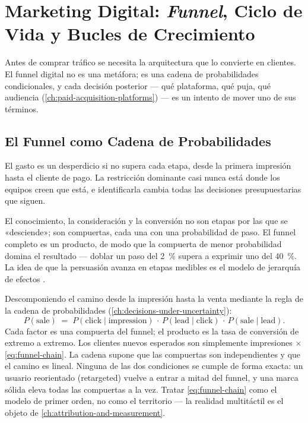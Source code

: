 \chapter{Marketing Digital: \emph{Funnel}, Ciclo de Vida y Bucles de Crecimiento}\label{ch:digital-funnel-and-crm}


Antes de comprar tráfico se necesita la arquitectura que lo convierte en clientes. El funnel digital no es una metáfora; es una cadena de probabilidades condicionales, y cada decisión posterior --- qué plataforma, qué puja, qué audiencia (\cref{ch:paid-acquisition-platforms}) --- es un intento de mover uno de sus términos.

\section{El Funnel como Cadena de Probabilidades}\label{sec:funnel-chain}

El gasto es un desperdicio si no supera cada etapa, desde la primera impresión hasta el cliente de pago. La restricción dominante casi nunca está donde los equipos creen que está, e identificarla cambia todas las decisiones presupuestarias que siguen.

El conocimiento, la consideración y la conversión no son etapas por las que se «desciende»; son compuertas, cada una con una probabilidad de paso. El funnel completo es un producto, de modo que la compuerta de menor probabilidad domina el resultado --- doblar un paso del \qty{2}{\percent} supera a exprimir uno del \qty{40}{\percent}. La idea de que la persuasión avanza en etapas medibles es el modelo de jerarquía de efectos \parencite{lavidge1961model,barry1987development}.

Descomponiendo el camino desde la impresión hasta la venta mediante la regla de la cadena de probabilidades (\cref{ch:decisions-under-uncertainty}):
\begin{equation}\label{eq:funnel-chain}
  P(\text{sale}) \;=\; P(\text{click}\mid\text{impression})\,\cdot\,P(\text{lead}\mid\text{click})\,\cdot\,P(\text{sale}\mid\text{lead}).
\end{equation}
Cada factor es una compuerta del funnel; el producto es la tasa de conversión de extremo a extremo. Los clientes nuevos esperados son simplemente impresiones $\times$ \cref{eq:funnel-chain}. La cadena supone que las compuertas son independientes y que el camino es lineal. Ninguna de las dos condiciones se cumple de forma exacta: un usuario reorientado (retargeted) vuelve a entrar a mitad del funnel, y una marca sólida eleva todas las compuertas a la vez. Tratar \cref{eq:funnel-chain} como el modelo de primer orden, no como el territorio --- la realidad multitáctil es el objeto de \cref{ch:attribution-and-measurement}.

